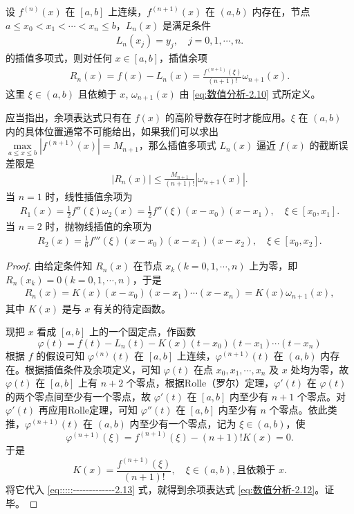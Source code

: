 \documentclass[../../main.tex]{subfiles}
\begin{document}
\begin{theorem}
设 $f^{(n)}(x)$ 在 $[a, b]$ 上连续，$f^{(n + 1)}(x)$ 在 $(a, b)$ 内存在，节点 $a \leqslant x_0 < x_1 < \cdots < x_n \leqslant b$，$L_n(x)$ 是满足条件 
\begin{align*}
L_n(x_j) = y_j, \quad j = 0, 1, \cdots, n.
\end{align*}
的插值多项式，则对任何 $x \in [a, b]$，插值余项 
\begin{align}
R_n(x) = f(x) - L_n(x) = \frac{f^{(n + 1)}(\xi)}{(n + 1)!} \omega_{n + 1}(x). \label{eq:数值分析-2.12}
\end{align}
这里 $\xi \in (a, b)$ 且依赖于 $x$,$\,\,\omega_{n + 1}(x)$ 由 \eqref{eq:数值分析-2.10} 式所定义。
\end{theorem}
\begin{remark}
应当指出，余项表达式只有在 $f(x)$ 的高阶导数存在时才能应用。$\xi$ 在 $(a, b)$ 内的具体位置通常不可能给出，如果我们可以求出 $\max\limits_{a \leqslant x \leqslant b} | f^{(n + 1)}(x) | = M_{n + 1}$，那么插值多项式 $L_n(x)$ 逼近 $f(x)$ 的截断误差限是
\begin{align}
| R_n(x) | \leqslant \frac{M_{n + 1}}{(n + 1)!} | \omega_{n + 1}(x) | .\label{eq:数值分析-2.14}
\end{align}
当 $n = 1$ 时，线性插值余项为 
\begin{align}
R_1(x) = \frac{1}{2} f''(\xi) \omega_2(x) = \frac{1}{2} f''(\xi)(x - x_0)(x - x_1), \quad \xi \in [x_0, x_1] .\label{eq:数值分析-2.15}
\end{align}
当 $n = 2$ 时，抛物线插值的余项为 
\begin{align}
R_2(x) = \frac{1}{6} f'''(\xi)(x - x_0)(x - x_1)(x - x_2), \quad \xi \in [x_0, x_2].\label{eq:数值分析-2.16}
\end{align}
\end{remark}
\begin{proof}
由给定条件知 $R_n(x)$ 在节点 $x_k (k = 0, 1, \cdots, n)$ 上为零，即 $R_n(x_k) = 0 (k = 0, 1, \cdots, n)$，于是 
\begin{align}
R_n(x) = K(x)(x - x_0)(x - x_1) \cdots (x - x_n) = K(x) \omega_{n + 1}(x),\label{eq:::::-------------2.13}
\end{align}
其中 $K(x)$ 是与 $x$ 有关的待定函数。

现把 $x$ 看成 $[a, b]$ 上的一个固定点，作函数 
\[
\varphi(t) = f(t) - L_n(t) - K(x)(t - x_0)(t - x_1) \cdots (t - x_n)
\]
根据 $f$ 的假设可知 $\varphi^{(n)}(t)$ 在 $[a, b]$ 上连续，$\varphi^{(n + 1)}(t)$ 在 $(a, b)$ 内存在。根据插值条件及余项定义，可知 $\varphi(t)$ 在点 $x_0, x_1, \cdots, x_n$ 及 $x$ 处均为零，故 $\varphi(t)$ 在 $[a, b]$ 上有 $n + 2$ 个零点，根据Rolle（罗尔）定理，$\varphi'(t)$ 在 $\varphi(t)$ 的两个零点间至少有一个零点，故 $\varphi'(t)$ 在 $[a, b]$ 内至少有 $n + 1$ 个零点。对 $\varphi'(t)$ 再应用Rolle定理，可知 $\varphi''(t)$ 在 $[a, b]$ 内至少有 $n$ 个零点。依此类推，$\varphi^{(n + 1)}(t)$ 在 $(a, b)$ 内至少有一个零点，记为 $\xi \in (a, b)$，使 
\[
\varphi^{(n + 1)}(\xi) = f^{(n + 1)}(\xi) - (n + 1)! K(x) = 0.
\]
于是 
\[
K(x) = \frac{f^{(n + 1)}(\xi)}{(n + 1)!}, \quad \xi \in (a, b), \text{且依赖于 } x.
\]
将它代入 \eqref{eq:::::-------------2.13} 式，就得到余项表达式 \eqref{eq:数值分析-2.12}。证毕。
\end{proof}
\end{document}

